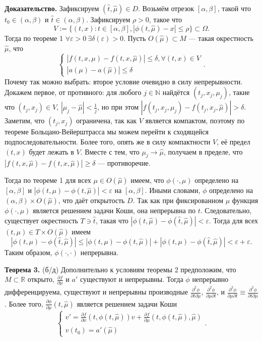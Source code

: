 \textbf{Доказательство.} Зафиксируем $(\widehat t, \widehat \mu) \in D$.
Возьмём отрезок $[\alpha, \beta]$, такой что $t_0 \in (\alpha, \beta)$ и $\widehat t \in (\alpha, \beta)$.
Зафиксируем $\rho > 0$, такое что
\[
    V := \{(t, x): t \in [\alpha, \beta], |\phi(t, \widehat \mu) - x| \le \rho\} \subset \Omega.
\]
Тогда по теореме 1 $\forall \varepsilon > 0~\exists \delta(\varepsilon) > 0$.
Пусть $O(\widehat \mu) \subset M$ --- такая окрестность $\widehat \mu$, что
\[
    \begin{cases}
        |f(t, x, \mu) - f(t, x, \widehat \mu)| \le \delta, \forall (t, x) \in V \\
        |a(\mu) - a(\widehat \mu)| \le \delta
    \end{cases}.
\]
Почему так можно выбрать: второе условие очевидно в силу непрерывности.
Докажем первое, от противного: для любого $j \in \mathbb N$ найдётся $(t_j, x_j, \mu_j)$, такие что $(t_j, x_j) \in V$, $|\mu_j - \widehat \mu| < \frac{1}{j}$, но при этом $|f(t_j, x_j, \mu_j) - f(t_j, x_j, \widehat \mu)| > \delta$.
Заметим, что $(t_j, x_j)$ ограничена, так как $V$ является компактом, поэтому по теореме Больцано-Вейерштрасса мы можем перейти к сходящейся подпоследовательности.
Более того, опять же в силу компактности $V$, её предел $(t, x)$ будет лежать в $V$.
Вместе с тем, что $\mu_j \to \widehat \mu$, получаем в пределе, что $|f(t, x, \widehat \mu) - f(t, x, \widehat \mu)| \ge \delta$ --- противоречие.

Тогда по теореме 1 для всех $\mu \in O(\widehat \mu)$ имеем, что $\phi(\cdot, \mu)$ определено на $[\alpha, \beta]$ и $|\phi(t, \mu) - \phi(t, \widehat \mu)| < \varepsilon$ на $[\alpha, \beta]$.
Иными словами, $\phi$ определено на $(\alpha, \beta) \times O(\widehat \mu)$, что даёт открытость $D$.
Так как при фиксированном $\mu$ функция $\phi(\cdot, \mu)$ является решением задачи Коши, она непрерывна по $t$.
Следовательно, существует окрестность $T \ni \widehat t$, такая что $|\phi(t, \widehat \mu) - \phi(\widehat t, \widehat \mu)| < \varepsilon$.
Тогда для всех $(t, \mu) \in T \times O(\widehat \mu)$ имеем
\[
    |\phi(t, \mu) - \phi(\widehat t, \widehat \mu)| \le |\phi(t, \mu) - \phi(t, \widehat \mu)| + |\phi(t, \mu) - \phi(\widehat t, \widehat \mu)| < \varepsilon + \varepsilon.
\]
Таким образом, $\phi(\cdot, \cdot)$ непрерывна.

\QED

\textbf{Теорема 3.} (б/д) Дополнительно к условиям теоремы 2 предположим, что $M \subset \mathbb R$ открыто, $\frac{\partial f}{\partial \mu}$ и $a'$ существуют и непрерывны.
Тогда $\phi$ непрерывно дифференцируема, существуют и непрерывны производные $\frac{\partial^2 \phi}{\partial t \partial \mu}$, $\frac{\partial^2 \phi}{\partial \mu \partial t}$, и $\frac{\partial^2 \phi}{\partial \mu \partial t} \equiv \frac{\partial^2 \phi}{\partial t \partial \mu}$.
Более того, $\frac{\partial \phi}{\partial \mu}(t, \widehat \mu)$ является решением задачи Коши
\[
    \begin{cases}
        v' = \frac{\partial f}{\partial x} (t, \phi(t, \widehat \mu))v + \frac{\partial f}{\partial \mu} (t, \phi(t, \widehat \mu), \widehat \mu) \\
        v(t_0) = a'(\widehat \mu)
    \end{cases}.
\]

